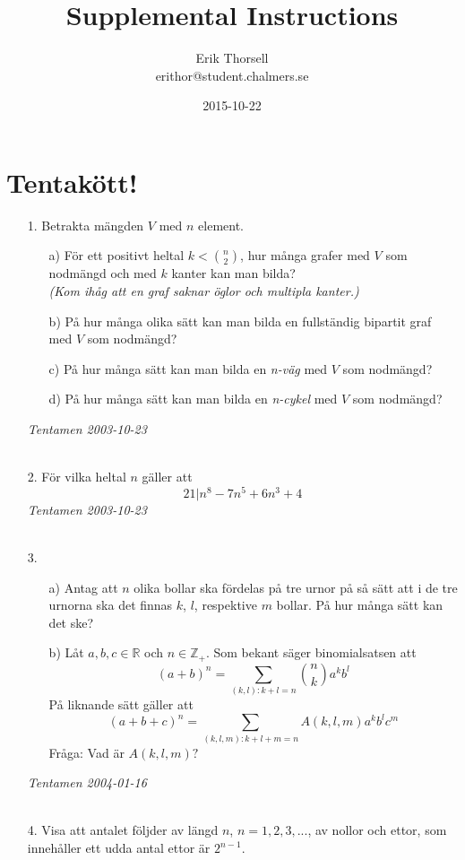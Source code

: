 \documentclass{article}
\title{Supplemental Instructions}
\author{Erik Thorsell \\ 
		\small{erithor@student.chalmers.se}
}
\date{2015-10-22}
\begin{document}
\maketitle

\section*{Tentakött!}

\begin{enumerate}

\item[1.]
Betrakta mängden $V$ med $n$ element.
\begin{itemize}
    \item[a)] För ett positivt heltal $k < \binom{n}{2}$, hur många grafer med 
              $V$ som nodmängd och med $k$ kanter kan man bilda?\\
              {\it (Kom ihåg att en graf saknar öglor och multipla kanter.)}
    \item[b)] På hur många olika sätt kan man bilda en fullständig bipartit 
              graf med $V$ som nodmängd?
    \item[c)] På hur många sätt kan man bilda en {\it n-väg} med $V$ som 
              nodmängd?
    \item[d)] På hur många sätt kan man bilda en {\it n-cykel} med $V$ som 
              nodmängd?
\end{itemize}
{\it Tentamen 2003-10-23}\\
\\
\item[2.]
    För vilka heltal $n$ gäller att $$21|n^8 - 7n^5 + 6n^3 + 4$$
{\it Tentamen 2003-10-23}\\
\\
\item[3.]
\begin{itemize}
    \item[a)] Antag att $n$ olika bollar ska fördelas på tre urnor på så sätt 
              att i de tre urnorna ska det finnas $k$, $l$, respektive $m$ 
              bollar. På hur många sätt kan det ske?
    \item[b)] Låt $a,b,c \in \mathbb{R}$ och $n \in \mathbb{Z}_{+}$. Som 
              bekant säger binomialsatsen att $$(a+b)^n = \sum_{(k,l):k+l=n} 
              \binom{n}{k}a^kb^l$$
              På liknande sätt gäller att $$(a+b+c)^n = \sum_{(k,l,m):k+l+m=n} 
              A(k,l,m)a^kb^lc^m$$
              Fråga: Vad är $A(k,l,m)?$\\
\end{itemize}
{\it Tentamen 2004-01-16}\\
\\
\item[4.]
    Visa att antalet följder av längd $n$, $n=1,2,3,...$, av nollor och ettor, 
    som innehåller ett udda antal ettor är $2^{n-1}$.


\end{enumerate}
\end{document}
